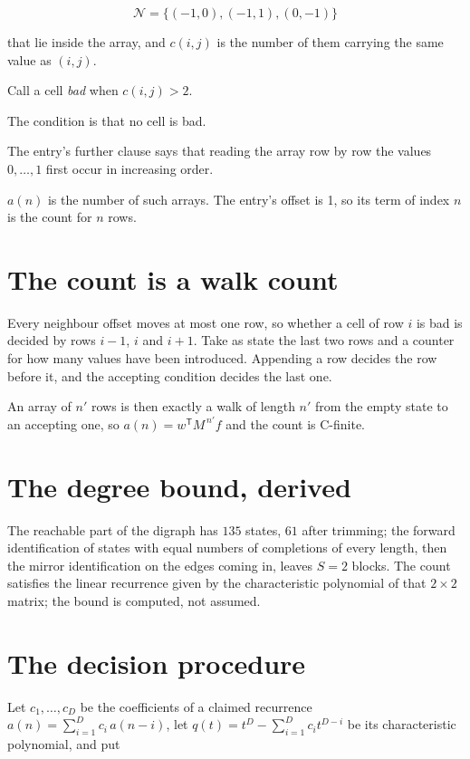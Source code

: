 \documentclass[11pt]{article}
\theoremstyle{definition}
\begin{document}
\[\mathcal{N} = \{(-1,0), (-1,1), (0,-1)\}\]

that lie inside the array, and $c(i,j)$ is the number of them carrying the same value as $(i,j)$.

Call a cell {\itshape bad} when $c(i,j) > 2$.

The condition is that no cell is bad.

The entry's further clause says that reading the array row by row the values $0,\dots,1$ first occur in increasing order.

$a(n)$ is the number of such arrays. The entry's offset is 1, so its term of index $n$ is the count for $n$ rows.

\section{The count is a walk count}

Every neighbour offset moves at most one row, so whether a cell of row $i$ is bad is decided by rows $i-1$, $i$ and $i+1$. Take as state the last two rows and a counter for how many values have been introduced. Appending a row decides the row before it, and the accepting condition decides the last one.

An array of $n'$ rows is then exactly a walk of length $n'$ from the empty state to an accepting one, so $a(n) = w^{\mathsf T}M^{\,n'}f$ and the count is C-finite.

\section{The degree bound, derived}

The reachable part of the digraph has $135$ states, $61$ after trimming; the forward identification of states with equal numbers of completions of every length, then the mirror identification on the edges coming in, leaves $S = 2$ blocks. The count satisfies the linear recurrence given by the characteristic polynomial of that $2\times2$ matrix; the bound is computed, not assumed.

\section{The decision procedure}

Let $c_1,\dots,c_D$ be the coefficients of a claimed recurrence $a(n) = \sum_{i=1}^{D} c_i\,a(n-i)$, let $q(t) = t^{D} - \sum_{i=1}^{D} c_i t^{D-i}$ be its characteristic polynomial, and put
\end{document}
